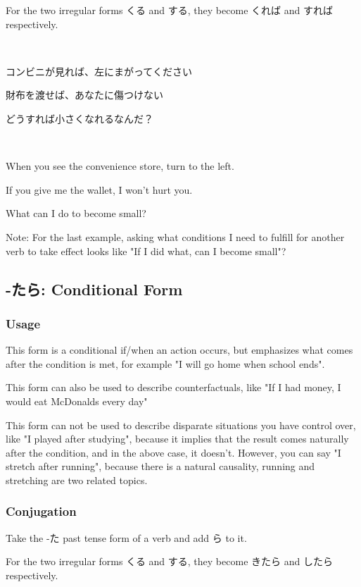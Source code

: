 \documentclass{article}
\begin{document}
\begin{CJK}{UTF8}{min}
For the two irregular forms くる and する, they become くれば and すれば respectively.
\begin{example}
\ 

コンビニが見れば、左にまがってください

財布を渡せば、あなたに傷つけない

どうすれば小さくなれるなんだ？
\end{example}

\begin{solution}
\ 

When you see the convenience store, turn to the left.

If you give me the wallet, I won't hurt you.

What can I do to become small?
\end{solution}

Note: For the last example, asking what conditions I need to fulfill for another verb to take effect looks like "If I did what, can I become small"?

\subsection{-たら: Conditional Form}

\subsubsection{Usage}

This form is a conditional if/when an action occurs, but emphasizes what comes after the condition is met, for example "I will go home when school ends".

This form can also be used to describe counterfactuals, like "If I had money, I would eat McDonalds every day"

This form can not be used to describe disparate situations you have control over, like "I played after studying", because it implies that the result comes naturally after the condition, and in the above case, it doesn't. However, you can say "I stretch after running", because there is a natural causality, running and stretching are two related topics.

\subsubsection{Conjugation}

Take the -た past tense form of a verb and add ら to it.

For the two irregular forms くる and する, they become きたら and したら respectively.
\begin{example}
\ 


\end{example}
\end{CJK}
\end{document}
